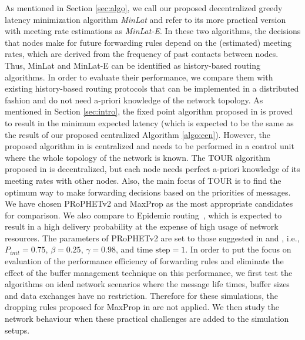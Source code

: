\documentclass[journal,onecolumn,11pt]{IEEEtran}
\theoremstyle{plain}
\theoremstyle{definition}
\begin{document}
As mentioned in Section \ref{sec:algo}, we call our proposed
decentralized greedy latency minimization algorithm {\em MinLat} and refer
to its more practical version with meeting rate estimations as
{\em MinLat-E}. In these two algorithms, the decisions that nodes make for
future forwarding rules depend on the (estimated) meeting rates, which
are derived from the frequency of past contacts between nodes. Thus, MinLat and
MinLat-E can be identified as history-based routing algorithms. In
order to evaluate their performance, we compare them with
existing history-based routing protocols that can be
implemented in a distributed fashion and do not need a-priori
knowledge of the network topology.  As mentioned in Section
\ref{sec:intro}, the fixed point algorithm proposed in
\cite{conan2008fixed} is proved to result in the minimum expected
latency (which is expected to be the same as the result of our
proposed centralized Algorithm \ref{algo:cen}). However, the proposed
algorithm in \cite{conan2008fixed} is centralized and needs to be
performed in a control unit where the whole topology of the network is
known. The TOUR algorithm proposed in \cite{xiao2013tour} is
decentralized, but each node needs perfect a-priori
knowledge of its meeting rates with other nodes. Also, the main focus
of TOUR is to find the optimum way to make forwarding decisions
based on the priorities of messages. We have chosen PRoPHETv2 \cite{grasic2011evolution} and MaxProp
\cite{burgess2006maxprop} as the most appropriate candidates for
comparison. We also compare to Epidemic
routing~\cite{vahdat2000epidemic}, which is expected
to result in a high delivery probability at the expense of high usage
of network resources. The parameters of PRoPHETv2 are set to those
suggested in \cite{lindgren2003probabilistic} and
\cite{grasic2011evolution}, i.e., $P_{init}=0.75$, $\beta=0.25$,
$\gamma=0.98$, and $\text{time step}=1$. In order to put the focus on
evaluation of the performance efficiency of forwarding rules and
eliminate the effect of the buffer management technique on this
performance, we first test the algorithms on ideal network scenarios
where the message life times, buffer sizes and data exchanges have no
restriction. Therefore for these simulations, the dropping rules proposed
for MaxProp in \cite{burgess2006maxprop} are not applied. We then
study the network behaviour when these practical challenges are added
to the simulation setups.
\end{document}
